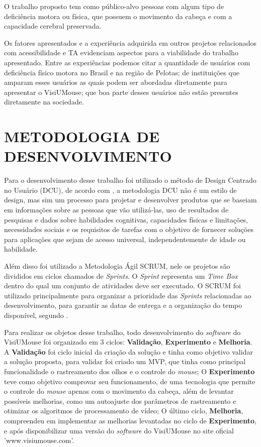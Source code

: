 O trabalho proposto tem como público-alvo pessoas com algum tipo de deficiência motora ou física, que possuem o movimento da cabeça e com a capacidade cerebral preservada.

Os fatores apresentados e a experiência adquirida em outros projetos relacionados com acessibilidade e TA evidenciam aspectos para a viabilidade do trabalho apresentado. Entre as experiências podemos citar a quantidade de usuários com deficiência físico motora no Brasil e na região de Pelotas; de instituições que amparam esses usuários as quais podem ser abordadas diretamente para apresentar o VisiUMouse; que boa parte desses usuários não estão presentes diretamente na sociedade.

\section{METODOLOGIA DE DESENVOLVIMENTO}\label{Sub:metodologia-desenvolvimento}
Para o desenvolvimento desse trabalho foi utilizado o método de Design Centrado no Usuário (DCU), de acordo com \cite{GREENHOUSE2010}, a metodologia DCU não é um estilo de design, mas sim um processo para projetar e desenvolver produtos que se baseiam em informações sobre as pessoas que vão utilizá-las, uso de resultados de pesquisas e dados sobre habilidades cognitivas, capacidades físicas e limitações, necessidades sociais e os requisitos de tarefas com o objetivo de fornecer soluções para aplicações que sejam de acesso universal, independentemente de idade ou habilidade. 

Além disso foi utilizado a Metodologia Ágil SCRUM, nele os projetos são divididos em ciclos chamados de \textit{Sprints}. O \textit{Sprint} representa um \textit{Time Box} dentro do qual um conjunto de atividades deve ser executado. O SCRUM foi utilizado principalmente para organizar a prioridade das \textit{Sprints} relacionadas ao desenvolvimento, para garantir as datas de entrega e a organização do tempo disponível, segundo .

Para realizar os objetos desse trabalho, todo desenvolvimento do \textit{software} do VisiUMouse foi organizado em 3 ciclos: \textbf{Validação}, \textbf{Experimento} e \textbf{Melhoria}. A \textbf{Validação} foi ciclo inicial da criação da solução e tinha como objetivo validar a solução proposta, para validar foi criado um MVP, que tinha como principal funcionalidade o rastreamento dos olhos e o controle do \textit{mouse}; O \textbf{Experimento} teve como objetivo comprovar seu funcionamento, de uma tecnologia que permite o controle do \textit{mouse} apenas com o movimento da cabeça, além de levantar possíveis melhorias, como um autoajuste dos parâmetros de rastreamento e otimizar os algoritmos de processamento de vídeo; O último ciclo, \textbf{Melhoria},  compreendeu em implementar as melhorias levantadas no ciclo de \textbf{Experimento}, e após disponibilizar uma versão do \textit{software} do VisiUMouse no site oficial 'www.visiumouse.com'.


